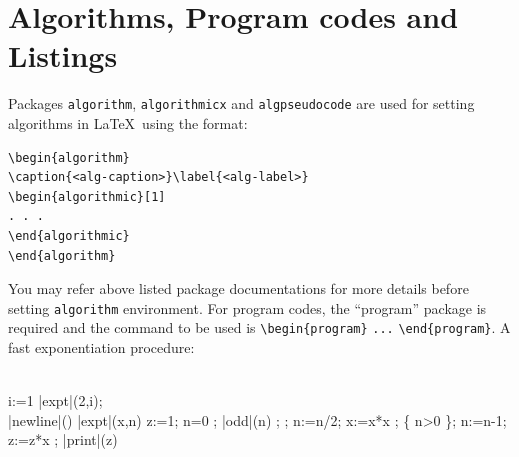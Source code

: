 \documentclass[sn-standardnature]{sn-jnl}%
\theoremstyle{thmstyleone}%
\theoremstyle{thmstyletwo}%
\theoremstyle{thmstylethree}%
\begin{document}
\section{Algorithms, Program codes and Listings}\label{sec7}

Packages \verb+algorithm+, \verb+algorithmicx+ and \verb+algpseudocode+ are used for setting algorithms in \LaTeX\ using the format:

\bigskip
\begin{verbatim}
\begin{algorithm}
\caption{<alg-caption>}\label{<alg-label>}
\begin{algorithmic}[1]
. . .
\end{algorithmic}
\end{algorithm}
\end{verbatim}
\bigskip

You may refer above listed package documentations for more details before setting \verb+algorithm+ environment. For program codes, the ``program'' package is required and the command to be used is \verb+\begin{program}+ \verb+...+ \verb+\end{program}+. A fast exponentiation procedure:

\begin{program}
\BEGIN \\ %
  \FOR i:=1   \DO
     |expt|(2,i); \\ |newline|() \OD %
\WHERE
\PROC |expt|(x,n) \BODY
          z:=1;
          \DO \IF n=0 \THEN \EXIT \FI;
             \DO \IF |odd|(n) \THEN \EXIT \FI;
;
                n:=n/2; x:=x*x \OD;
             \{ n>0 \};
             n:=n-1; z:=z*x \OD;
          |print|(z) \ENDPROC
\END
\end{program}
\end{document}
